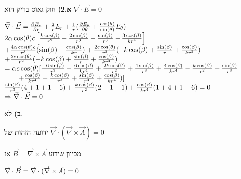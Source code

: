 \documentclass[14pt]{extarticle}
\makeatletter
\newenvironment{lefteqs}{%
    \begin{english}%
    \begin{flushleft}%
    \renewcommand{\arraystretch}{1.3}%
    $\begin{array}{@{}l@{}}%
}{%
    \end{array}$%
    \end{flushleft}%
    \end{english}%
}
\makeatother
\begin{document}
\textbf{א.2)} 
חוק גאוס בריק הוא $\vec{\nabla} \cdot \vec{E} = 0$
\begin{lefteqs}
    \vec{\nabla} \cdot \vec{E} = \frac{\partial E_r}{\partial r} + \frac{2}{r} E_r + \frac{1}{r} (\frac{\partial E_\theta}{\partial \theta} + \frac{\cos(\theta)}{\sin(\theta)} E_\theta) \\
    2 \alpha \cos(\theta) c \left[ \frac{k\cos(\beta)}{r^2} -\frac{2\sin(\beta)}{r^3} - \frac{\sin(\beta)}{r^3} - \frac{3\cos(\beta)}{kr^4} \right] \\
    + \frac{4\alpha \cos(\theta) c}{r^3} (\sin(\beta) + \frac{\cos(\beta)}{kr}) + \frac{2c \cos(\theta)}{r^2}(-k\cos(\beta) + \frac{\sin(\beta)}{r} + \frac{\cos(\beta)}{kr^2}) \\
    + \frac{2c\cos(\theta)}{r^2}(-k\cos(\beta) + \frac{\sin(\beta)}{r} + \frac{\cos(\beta)}{kr^4}) \\
    = \alpha c \cos(\theta) [\frac{-6\sin(\beta)}{r^3} - \frac{6\cos(\beta)}{kr^4} + \frac{2k\cos(\beta)}{r^2} + \frac{4\sin(\beta)}{r^3} + \frac{4\cos(\beta)}{kr^4} - \frac{k\cos(\beta)}{r^2} + \frac{\sin(\beta)}{r^3}\\
    \qquad + \frac{\cos(\beta)}{kr^4} - \frac{k\cos(\beta)}{r^2} + \frac{\sin(\beta)}{r^3} + \frac{\cos(\beta)}{kr^4}) ] \\
    \frac{\sin(\beta)}{r^3}(4+1+1-6) + \frac{k\cos(\beta)}{r^2}(2-1-1) + \frac{\cos(\beta)}{kr^4}(1+4+1-6) = 0 \\
    \Rightarrow \vec{\nabla} \cdot \vec{E} = 0
\end{lefteqs}

\textbf{ב)} 
לא.

ידועה הזהות של $\vec{\nabla} \cdot (\vec{\nabla} \times \vec{A})=0$

מכיוון שידוע $\vec{B} = \vec{\nabla} \times \vec{A}$ אז

\begin{lefteqs}
    \vec{\nabla} \cdot \vec{B} = \vec{\nabla} \cdot (\vec{\nabla} \times \vec{A}) = 0
\end{lefteqs}
\end{document}
